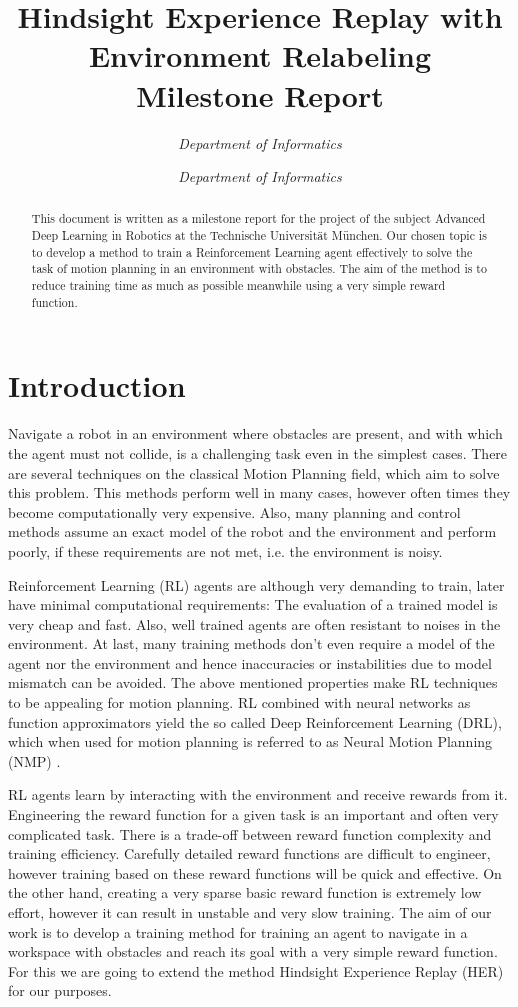 \documentclass[conference]{IEEEtran}
\title{Hindsight Experience Replay with Environment Relabeling \\
	\bigskip
\Large{Milestone Report}}
\author{\IEEEauthorblockN{Katharina Hermann}
	\IEEEauthorblockA{\textit{Technische Universität München}}
	\textit{Department of Informatics}
	\and
	\IEEEauthorblockN{Ferenc Török}
	\IEEEauthorblockA{\textit{Technische Universität München}}
	\textit{Department of Informatics}
}
\begin{document}
\maketitle

\begin{abstract}
	This document is written as a milestone report for the project of the subject Advanced Deep Learning in Robotics at the Technische Universität München. Our chosen topic is to develop a method to train a Reinforcement Learning \cite{sutton_barto} agent effectively to solve the task of motion planning in an environment with obstacles. The aim of the method is to reduce training time as much as possible meanwhile using a very simple reward function.
\end{abstract}

\section{Introduction}
Navigate a robot in an environment where obstacles are present, and with which the agent must not collide, is a challenging task even in the simplest cases. There are several techniques on the classical Motion Planning field, which aim to solve this problem. This methods perform well in many cases, however often times they become computationally very expensive. Also, many planning and control methods assume an exact model of the robot and the environment and perform poorly, if these requirements are not met, i.e. the environment is noisy.

Reinforcement Learning (RL) agents are although very demanding to train, later have minimal computational requirements: The evaluation of a trained model is very cheap and fast. Also, well trained agents are often resistant to noises in the environment. At last, many training methods don't even require a model of the agent nor the environment and hence inaccuracies or instabilities due to model mismatch can be avoided. The above mentioned properties make RL techniques to be appealing for motion planning. RL combined with neural networks as function approximators yield the so called Deep Reinforcement Learning (DRL), which when used for motion planning is referred to as Neural Motion Planning (NMP) \cite{NMP}.

RL agents learn by interacting with the environment and receive rewards from it. Engineering the reward function for a given task is an important and often very complicated task. There is a trade-off between reward function complexity and training efficiency. Carefully detailed reward functions are difficult to engineer, however training based on these reward functions will be quick and effective. On the other hand, creating a very sparse basic reward function is extremely low effort, however it can result in unstable and very slow training. The aim of our work is to develop a training method for training an agent to navigate in a workspace with obstacles and reach its goal with a very simple reward function. For this we are going to extend the method Hindsight Experience Replay (HER) \cite{HER} for our purposes.
\end{document}
